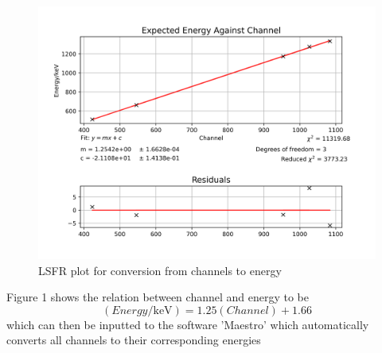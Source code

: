 \documentclass[12pt, a4paper]{article}
\begin{document}
	\begin{figure}[H] \centering
		\includegraphics[scale=0.5]{assets/Calibration.png}
		\caption{LSFR plot for conversion from channels to energy}
	\end{figure}

Figure 1 shows the relation between channel and energy to be
\begin{equation}
	(Energy/\unit{\keV}) = 1.25(Channel)+1.66
\end{equation}
which can then be inputted to the software 'Maestro' which automatically converts all channels to their corresponding energies
\end{document}
